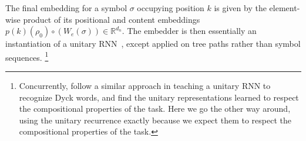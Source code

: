 The final embedding for a symbol $\sigma$ occupying position $k$ is given by the element-wise product of its positional and content embeddings $p(k)(\rho_0) \circ \left(W_e(\sigma)\right) \in \mathbb{R}^{d_n}$.
The embedder is then essentially an instantiation of a unitary RNN~\cite{arjovsky2016unitary}, except applied on tree paths rather than symbol sequences.%
	\footnote{Concurrently, \citet{bernardy2022assessing} follow a similar approach in teaching a unitary RNN to recognize Dyck words, and find the unitary representations learned to respect the compositional properties of the task.
	Here we go the other way around, using the unitary recurrence exactly because we expect them to respect the compositional properties of the task.}





